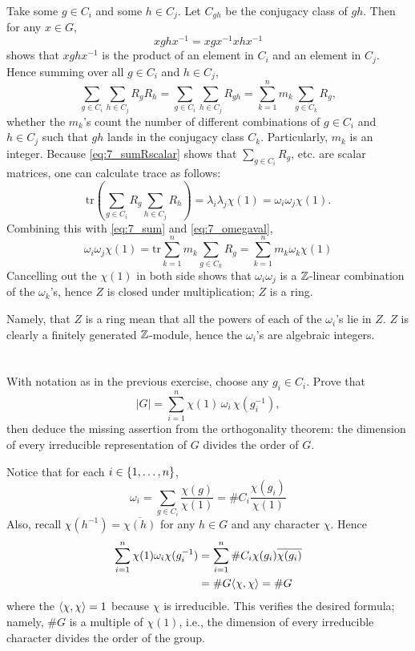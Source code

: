 \documentclass[12pt]{article}
\begin{document}
Take some $g \in C_i$ and some $h \in C_j$. 
Let $C_{gh}$ be the conjugacy class of $gh$. 
Then for any $x \in G$, 
$$xghx^{-1} = xgx^{-1} x hx^{-1}$$ 
shows that $xghx^{-1}$ is the product of an element in $C_i$ and an element in $C_j$. 
Hence summing over all $g \in C_i$ and $h \in C_{j}$, 
\begin{equation} \label{eq:7_sum}
  \sum_{g \in C_i} \sum_{h \in C_j} R_g R_h = \sum_{g \in C_i} \sum_{h \in C_j} R_{gh} = \sum_{k = 1}^{n} m_k \sum_{g \in C_k} R_g,
\end{equation}
whether the $m_k$'s count the number of different combinations of $g \in C_i$ and $h \in C_j$ such that $gh$ lands in the conjugacy class $C_k$. 
Particularly, $m_k$ is an integer. 
Because \eqref{eq:7_sumRscalar} shows that $\sum_{g \in C_i} R_g$, etc. are scalar matrices, one can calculate trace as follows: 
$$\text{tr}(\sum_{g \in C_i} R_g \sum_{h \in C_j} R_h) = \lambda_i \lambda_j \chi(1) = \omega_i \omega_j \chi(1).$$
Combining this with \eqref{eq:7_sum} and \eqref{eq:7_omegaval},
$$\omega_i \omega_j \chi(1) = \text{tr} \sum_{k = 1}^{n} m_k \sum_{g \in C_k} R_g = \sum_{k = 1}^{n} m_k \omega_k \chi(1)$$
Cancelling out the $\chi(1)$ in both side shows that $\omega_i \omega_j$ is a $\mathbb{Z}$-linear combination of the $\omega_k$'s, hence $Z$ is closed under multiplication; 
$Z$ is a ring. 

Namely, that $Z$ is a ring mean that all the powers of each of the $\omega_i$'s lie in $Z$. 
$Z$ is clearly a finitely generated $\mathbb{Z}$-module, hence the $\omega_i$'s are algebraic integers. 

\section{}
 
With notation as in the previous exercise, choose any $g_i \in C_i$. Prove that
\[
  |G| = \sum_{i=1}^n \chi(1)\, \omega_i\, \chi(g_i^{-1}),
\]
then deduce the missing assertion from the orthogonality theorem: the dimension of every irreducible representation of $G$ divides the order of $G$.

\noindent \dotfill 

Notice that for each $i \in \{1, \ldots, n\}$, 
$$\omega_i = \sum_{g \in C_i} \frac{\chi(g)}{\chi(1)} = \#C_i \frac{\chi(g_i)}{\chi(1)}$$
Also, recall $\chi(h^{-1}) = \overline{\chi(h)}$ for any $h \in G$ and any character $\chi$.  
Hence 
\begin{align*}
  \sum_{i = 1}^{n} \chi(1) \omega_i \chi(g_{i}^{-1}) 
  & = \sum_{i = 1}^{n} \#C_i \chi(g_i) \overline{\chi(g_i)} \\ 
  & = \#G \langle\chi, \chi\rangle  = \#G 
\end{align*}
where the $\langle\chi, \chi\rangle = 1$ because $\chi$ is irreducible. 
This verifies the desired formula; 
namely, $\#G$ is a multiple of $\chi(1)$, i.e., the dimension of every irreducible character divides the order of the group. 
\end{document}
